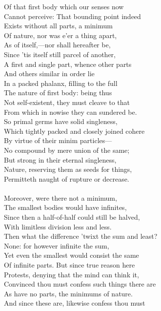 Of that first body which our senses now\\
Cannot perceive: That bounding point indeed\\
Exists without all parts, a minimum\\
Of nature, nor was e'er a thing apart,\\
As of itself,—nor shall hereafter be,\\
Since 'tis itself still parcel of another,\\
A first and single part, whence other parts\\
And others similar in order lie\\
In a packed phalanx, filling to the full\\
The nature of first body: being thus\\
Not self-existent, they must cleave to that\\
From which in nowise they can sundered be.\\
So primal germs have solid singleness,\\
Which tightly packed and closely joined cohere\\
By virtue of their minim particles—\\
No compound by mere union of the same;\\
But strong in their eternal singleness,\\
Nature, reserving them as seeds for things,\\
Permitteth naught of rupture or decrease.\\
\\
Moreover, were there not a minimum,\\
The smallest bodies would have infinites,\\
Since then a half-of-half could still be halved,\\
With limitless division less and less.\\
Then what the difference 'twixt the sum and least?\\
None: for however infinite the sum,\\
Yet even the smallest would consist the same\\
Of infinite parts. But since true reason here\\
Protests, denying that the mind can think it,\\
Convinced thou must confess such things there are\\
As have no parts, the minimums of nature.\\
And since these are, likewise confess thou must\\
